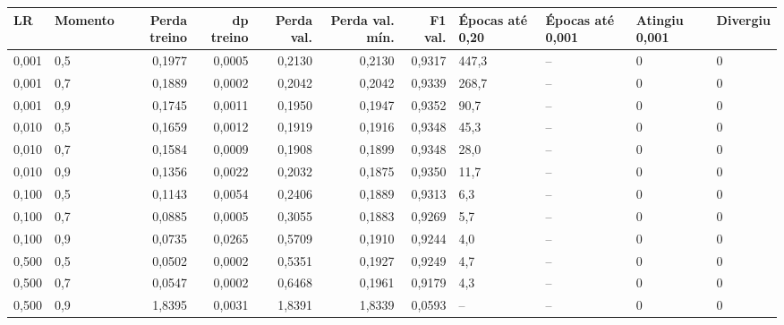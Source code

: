 \begin{tabular}{llrrrrrllll}
\toprule
LR & Momento & Perda treino & dp treino & Perda val. & Perda val. mín. & F1 val. & Épocas até 0,20 & Épocas até 0,001 & Atingiu 0,001 & Divergiu \\
\midrule
0,001 & 0,5 & 0,1977 & 0,0005 & 0,2130 & 0,2130 & 0,9317 & 447,3 & -- & 0 & 0 \\
0,001 & 0,7 & 0,1889 & 0,0002 & 0,2042 & 0,2042 & 0,9339 & 268,7 & -- & 0 & 0 \\
0,001 & 0,9 & 0,1745 & 0,0011 & 0,1950 & 0,1947 & 0,9352 & 90,7 & -- & 0 & 0 \\
0,010 & 0,5 & 0,1659 & 0,0012 & 0,1919 & 0,1916 & 0,9348 & 45,3 & -- & 0 & 0 \\
0,010 & 0,7 & 0,1584 & 0,0009 & 0,1908 & 0,1899 & 0,9348 & 28,0 & -- & 0 & 0 \\
0,010 & 0,9 & 0,1356 & 0,0022 & 0,2032 & 0,1875 & 0,9350 & 11,7 & -- & 0 & 0 \\
0,100 & 0,5 & 0,1143 & 0,0054 & 0,2406 & 0,1889 & 0,9313 & 6,3 & -- & 0 & 0 \\
0,100 & 0,7 & 0,0885 & 0,0005 & 0,3055 & 0,1883 & 0,9269 & 5,7 & -- & 0 & 0 \\
0,100 & 0,9 & 0,0735 & 0,0265 & 0,5709 & 0,1910 & 0,9244 & 4,0 & -- & 0 & 0 \\
0,500 & 0,5 & 0,0502 & 0,0002 & 0,5351 & 0,1927 & 0,9249 & 4,7 & -- & 0 & 0 \\
0,500 & 0,7 & 0,0547 & 0,0002 & 0,6468 & 0,1961 & 0,9179 & 4,3 & -- & 0 & 0 \\
0,500 & 0,9 & 1,8395 & 0,0031 & 1,8391 & 1,8339 & 0,0593 & -- & -- & 0 & 0 \\
\bottomrule
\end{tabular}
